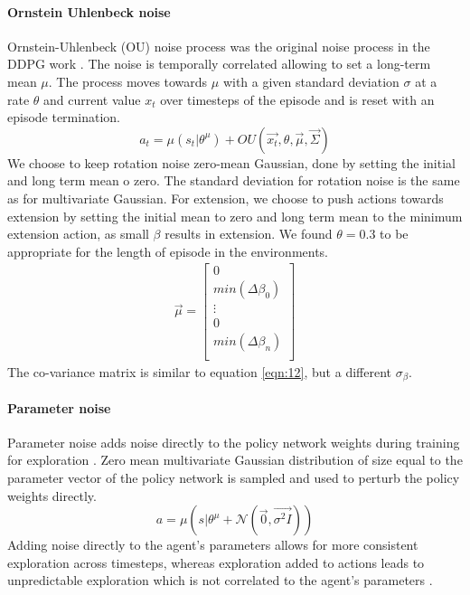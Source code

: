 \paragraph{Ornstein Uhlenbeck noise}
Ornstein-Uhlenbeck (OU) noise process was the original noise process in the DDPG work  \cite{Lillicrap2015}. The noise is temporally correlated allowing to set a long-term mean $\mu$. The process moves towards $\mu$ with a given standard deviation $\sigma$ at a rate $\theta$ and current value $x_t$ over timesteps of the episode and is reset with an episode termination.
\begin{equation}
    a_t = \mu(s_t | \theta^\mu) + OU \left( \Vec{x_{t}}, \theta, \Vec{\mu}, \Vec{\Sigma} \right)
\end{equation}
We choose to keep rotation noise zero-mean Gaussian, done by setting the initial and long term mean o zero. The standard deviation for rotation noise is the same as for multivariate Gaussian. For extension, we choose to push actions towards extension by setting the initial mean to zero and long term mean to the minimum extension action, as small $\beta$ results in extension. We found $\theta=0.3$ to be appropriate for the length of episode in the environments.
\begin{equation}
\begin{aligned}
\Vec{\mu} =
\left [
\begin{matrix}
0 \\
min(\Delta \beta_0) \\
\vdots \\
0 \\
min(\Delta \beta_n) \\
\end{matrix}
\right ]
\end{aligned}
\end{equation}
The co-variance matrix is similar to equation \ref{eqn:12}, but a different $\sigma_\beta$.

\paragraph{Parameter noise}
Parameter noise adds noise directly to the policy network weights during training for exploration \cite{plappert2017parameter}. Zero mean multivariate Gaussian distribution of size equal to the parameter vector of the policy network is sampled and used to perturb the policy weights directly.
\begin{equation}
    a = \mu(s | \theta^{\mu} + \mathcal{N} (\Vec{0}, \Vec{\sigma^2 I})) 
\end{equation}
Adding noise directly to the agent's parameters allows for more consistent exploration across timesteps, whereas exploration added to actions leads to unpredictable exploration which is not correlated to the agent's parameters \cite{plappert2017parameter}.

